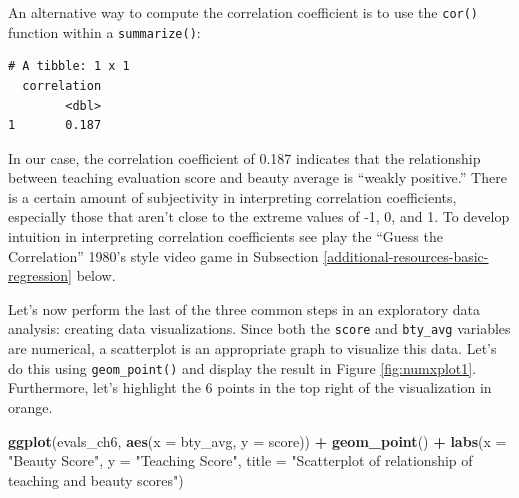 \documentclass[12pt, krantz2,]{krantz}
\makeatletter
\newenvironment{Shaded}{\begin{snugshade}}{\end{snugshade}}
\newcommand{\DataTypeTok}[1]{\textcolor[rgb]{0.27,0.27,0.27}{#1}}
\newcommand{\KeywordTok}[1]{\textcolor[rgb]{0.27,0.27,0.27}{\textbf{#1}}}
\newcommand{\NormalTok}[1]{#1}
\newcommand{\OperatorTok}[1]{\textcolor[rgb]{0.43,0.43,0.43}{\textbf{#1}}}
\newcommand{\StringTok}[1]{\textcolor[rgb]{0.5,0.5,0.5}{#1}}
\newenvironment{kframe}{%
\medskip{}
\setlength{\fboxsep}{.8em}
 \def\at@end@of@kframe{}%
 \ifinner\ifhmode%
  \def\at@end@of@kframe{\end{minipage}}%
  \begin{minipage}{\columnwidth}%
 \fi\fi%
 \def\FrameCommand##1{\hskip\@totalleftmargin \hskip-\fboxsep
 \colorbox{shadecolor}{##1}\hskip-\fboxsep
     \hskip-\linewidth \hskip-\@totalleftmargin \hskip\columnwidth}%
 \MakeFramed {\advance\hsize-\width
   \@totalleftmargin\z@ \linewidth\hsize
   \@setminipage}}%
 {\par\unskip\endMakeFramed%
 \at@end@of@kframe}
\renewenvironment{Shaded}{\begin{kframe}}{\end{kframe}}
\makeatother
\begin{document}
An alternative way to compute the correlation coefficient is to use the \texttt{cor()} function within a \texttt{summarize()}:

\begin{Shaded}
\end{Shaded}

\begin{verbatim}
# A tibble: 1 x 1
  correlation
        <dbl>
1       0.187
\end{verbatim}

In our case, the correlation coefficient of 0.187 indicates that the relationship between teaching evaluation score and beauty average is ``weakly positive.'' There is a certain amount of subjectivity in interpreting correlation coefficients, especially those that aren't close to the extreme values of -1, 0, and 1. To develop intuition in interpreting correlation coefficients see play the ``Guess the Correlation'' 1980's style video game in Subsection \ref{additional-resources-basic-regression} below.

Let's now perform the last of the three common steps in an exploratory data analysis: creating data visualizations. Since both the \texttt{score} and \texttt{bty\_avg} variables are numerical, a scatterplot is an appropriate graph to visualize this data. Let's do this using \texttt{geom\_point()} and display the result in Figure \ref{fig:numxplot1}. Furthermore, let's highlight the 6 points in the top right of the visualization in orange.

\begin{Shaded}
\begin{Highlighting}[]
\KeywordTok{ggplot}\NormalTok{(evals_ch6, }\KeywordTok{aes}\NormalTok{(}\DataTypeTok{x =}\NormalTok{ bty_avg, }\DataTypeTok{y =}\NormalTok{ score)) }\OperatorTok{+}
\StringTok{  }\KeywordTok{geom_point}\NormalTok{() }\OperatorTok{+}
\StringTok{  }\KeywordTok{labs}\NormalTok{(}\DataTypeTok{x =} \StringTok{"Beauty Score"}\NormalTok{, }\DataTypeTok{y =} \StringTok{"Teaching Score"}\NormalTok{,}
       \DataTypeTok{title =} \StringTok{"Scatterplot of relationship of teaching and beauty scores"}\NormalTok{)}
\end{Highlighting}
\end{Shaded}
\end{document}
